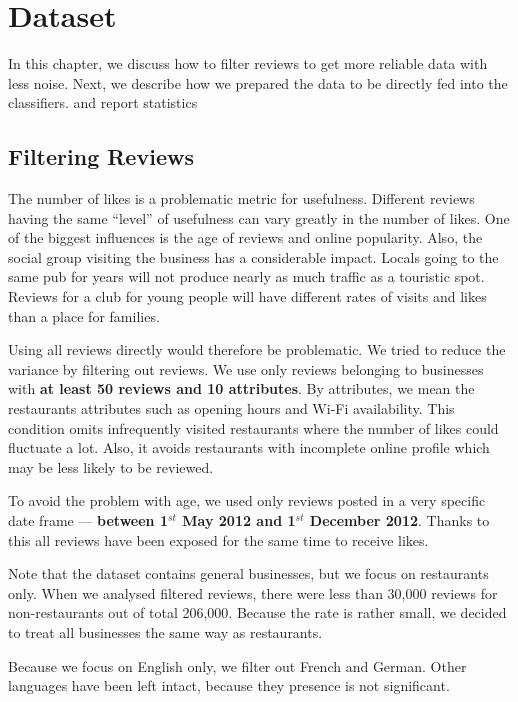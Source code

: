 \chapter{Dataset}\label{chap:dataset}

In this chapter, we discuss how to filter reviews to get more reliable data with
less noise.
Next, we describe how we prepared the data to be directly fed into the classifiers.
and report statistics


\section{Filtering Reviews}\label{sec:filter}


The number of likes is a problematic metric for usefulness.
Different reviews having the same ``level'' of usefulness can vary greatly
in the number of likes.
One of the biggest influences is the age of reviews and online popularity.
Also, the social group visiting the business has a considerable impact.
Locals going to the same pub for years will not produce nearly as much traffic
as a touristic spot.
Reviews for a club for young people will have different rates of visits and likes
than a place for families.

Using all reviews directly would therefore be problematic.
We tried to reduce the variance by filtering out reviews.
We use only reviews belonging to businesses with \textbf{at least 50 reviews and 10 attributes}.
By attributes, we mean the restaurants attributes such as opening hours and Wi-Fi availability.
This condition omits infrequently visited restaurants where the number of likes could fluctuate a lot.
Also, it avoids restaurants with incomplete online profile which may be less likely to be reviewed.

To avoid the problem with age, we used only reviews posted in a very specific date frame
--- \textbf{between 1$^{st}$ May 2012 and 1$^{st}$ December 2012}.
Thanks to this all reviews have been exposed for the same time to receive likes.

Note that the dataset contains general businesses, but we focus on restaurants only.
When we analysed filtered reviews,
there were less than 30,000 reviews for non-restaurants out of total 206,000.
Because the rate is rather small,
we decided to treat all businesses the same way as restaurants.

Because we focus on English only, we filter out French and German.
Other languages have been left intact, because they presence is not significant.

